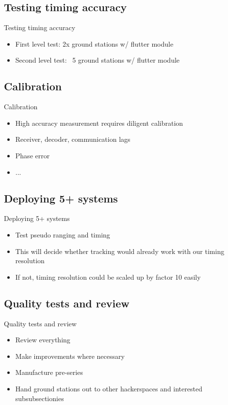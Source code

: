 \subsection{Testing timing accuracy}
	\begin{frame}{Testing timing accuracy}
		\begin{itemize}
			\item First level test: 2x ground stations w/ flutter module
			\item Second level test: ~5 ground stations w/ flutter module
		\end{itemize}
	\end{frame}

\subsection{Calibration}
	\begin{frame}{Calibration}
		\begin{itemize}
			\item High accuracy measurement requires diligent calibration
			\item Receiver, decoder, communication lags
			\item Phase error
			\item ...
		\end{itemize}
	\end{frame}

\subsection{Deploying 5+ systems}
	\begin{frame}{Deploying 5+ systems}
		\begin{itemize}
			\item Test pseudo ranging and timing
			\item This will decide whether tracking would already work with our timing resolution
			\item If not, timing resolution could be scaled up by factor 10 easily
		\end{itemize}
	\end{frame}

\subsection{Quality tests and review}
	\begin{frame}{Quality tests and review}
		\begin{itemize}
			\item Review everything
			\item Make improvements where necessary
			\item Manufacture pre-series
			\item Hand ground stations out to other hackerspaces and interested subsubsectionies
		\end{itemize}
	\end{frame}

